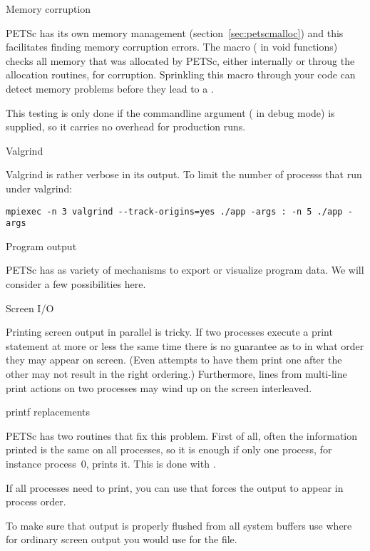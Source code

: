  {Memory corruption}
\label{sec:petsc-mem}

PETSc has its own memory management (section~\ref{sec:petscmalloc})
and this facilitates finding memory corruption errors.
The macro  ( in void functions)
checks all memory that was allocated by PETSc,
either internally or throug the allocation routines,
for corruption. Sprinkling this macro through your code
can detect memory problems before they lead to a .

This testing is only done if the commandline argument
 ( in debug mode)
is supplied, so it carries no overhead for production runs.

 {Valgrind}

Valgrind is rather verbose in its output.
To limit the number of processs that run under valgrind:
\begin{verbatim}
mpiexec -n 3 valgrind --track-origins=yes ./app -args : -n 5 ./app -args
\end{verbatim}

 {Program output}

PETSc has as variety of mechanisms to export or visualize program data.
We will consider a few possibilities here.

 {Screen I/O}

Printing screen output in parallel is tricky. If two processes execute
a print statement at more or less the same time there is no guarantee
as to in what order they may appear on screen. (Even attempts to have
them print one after the other may not result in the right ordering.)
Furthermore, lines from multi-line print actions on two processes may
wind up on the screen interleaved.

 {printf replacements}

PETSc has two routines that fix this problem. First of all, often the
information printed is the same on all processes, so it is enough if
only one process, for instance process~0, prints it. This is done with
.

If all processes need to print, you can use
 that forces the
output to appear in process order.

To make sure that output is properly flushed from all system buffers
use 
where for ordinary screen output you would use  for the file.


